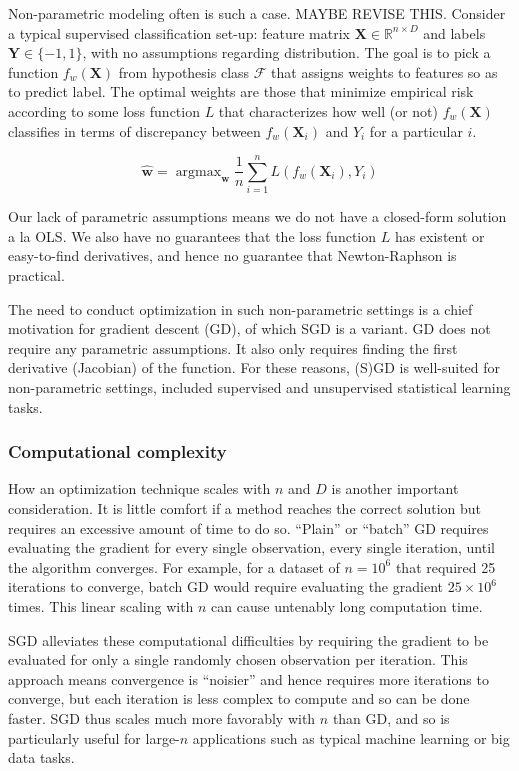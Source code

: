 \documentclass{article}
\DeclareMathOperator*{\argmax}{argmax}
\begin{document}
Non-parametric modeling often is such a case. MAYBE REVISE THIS. Consider a typical supervised
classification set-up: feature matrix $\bm{X} \in \mathbb{R}^{n \times D}$ and
labels $\bm{Y} \in \{-1, 1\}$, with no assumptions regarding distribution. The goal is to pick a function
$f_w(\bm{X})$ from hypothesis class $\mathcal{F}$ that assigns weights to
features so as to predict label. The optimal weights are those that minimize empirical risk
according to some loss function $L$ that characterizes how well (or not)
$f_w(\bm{X})$ classifies in terms of discrepancy between $f_w(\bm{X}_i)$ and
$Y_i$ for a particular $i$.

$$
\hat{\bm{w}} = \argmax_{\bm{w}} \frac{1}{n} \sum_{i=1}^n L(f_w(\bm{X}_i), Y_i)
$$

Our lack of parametric assumptions means we do not have a closed-form solution a
la OLS. We also have no guarantees that the loss function $L$ has existent or easy-to-find derivatives, 
and hence no guarantee that Newton-Raphson is practical. 

The need to conduct optimization in such non-parametric settings is a chief
motivation for gradient descent (GD), of which SGD is a variant. GD
does not require any parametric assumptions. It also only requires finding the
first derivative (Jacobian) of the function. For these reasons, (S)GD is
 well-suited for non-parametric settings, included supervised and
unsupervised statistical learning tasks.

\subsubsection{Computational complexity}

How an optimization technique scales with $n$ and $D$ is another important
consideration. It is little comfort if a method reaches the correct solution but
requires an excessive amount of time to do so. ``Plain'' or
``batch'' GD requires evaluating the gradient for every single observation,
every single iteration, until the algorithm converges. For example, for a
dataset of $n=10^6$ that required 25 iterations to converge, batch GD would require 
evaluating the gradient $25 \times 10^6$ times. This linear scaling with
$n$ can cause untenably long computation time.

SGD alleviates these computational difficulties by requiring the gradient to be
evaluated for only a single randomly chosen observation per iteration. This
approach means convergence is ``noisier'' and hence requires more iterations to
converge, but each iteration is less complex to compute and so can be done
faster. SGD thus scales much more favorably with $n$ than GD, and so is
particularly useful for large-$n$ applications such as typical machine learning
or big data tasks.
\end{document}
